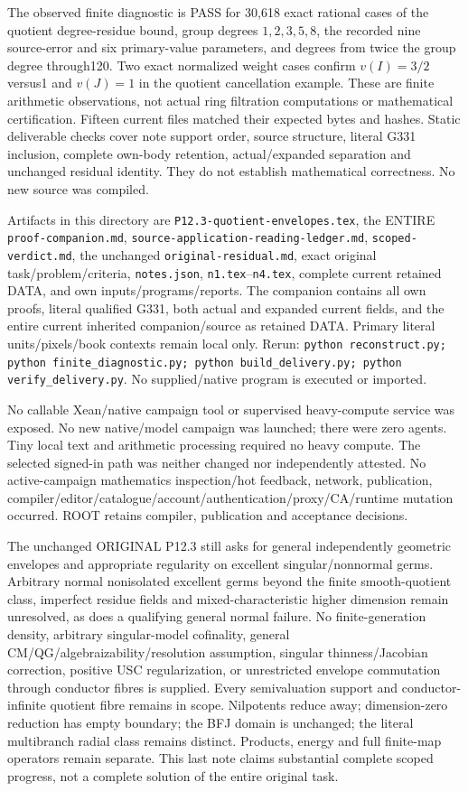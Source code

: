 The observed finite diagnostic is PASS for 30,618 exact rational cases of the quotient degree-residue bound, group degrees $1,2,3,5,8$, the recorded nine source-error and six primary-value parameters, and degrees from twice the group degree through120. Two exact normalized weight cases confirm $v(I)=3/2$ versus1 and $v(J)=1$ in the quotient cancellation example. These are finite arithmetic observations, not actual ring filtration computations or mathematical certification. Fifteen current files matched their expected bytes and hashes. Static deliverable checks cover note support order, source structure, literal G331 inclusion, complete own-body retention, actual/expanded separation and unchanged residual identity. They do not establish mathematical correctness. No new source was compiled.

Artifacts in this directory are \texttt{P12.3-quotient-envelopes.tex}, the ENTIRE \texttt{proof-companion.md}, \texttt{source-application-reading-ledger.md}, \texttt{scoped-verdict.md}, the unchanged \texttt{original-residual.md}, exact original task/problem/criteria, \texttt{notes.json}, \texttt{n1.tex}--\texttt{n4.tex}, complete current retained DATA, and own inputs/programs/reports. The companion contains all own proofs, literal qualified G331, both actual and expanded current fields, and the entire current inherited companion/source as retained DATA. Primary literal units/pixels/book contexts remain local only. Rerun: \texttt{python reconstruct.py; python finite\_diagnostic.py; python build\_delivery.py; python verify\_delivery.py}. No supplied/native program is executed or imported.

No callable Xean/native campaign tool or supervised heavy-compute service was exposed. No new native/model campaign was launched; there were zero agents. Tiny local text and arithmetic processing required no heavy compute. The selected signed-in path was neither changed nor independently attested. No active-campaign mathematics inspection/hot feedback, network, publication, compiler/editor/catalogue/account/authentication/proxy/CA/runtime mutation occurred. ROOT retains compiler, publication and acceptance decisions.

The unchanged ORIGINAL P12.3 still asks for general independently geometric envelopes and appropriate regularity on excellent singular/nonnormal germs. Arbitrary normal nonisolated excellent germs beyond the finite smooth-quotient class, imperfect residue fields and mixed-characteristic higher dimension remain unresolved, as does a qualifying general normal failure. No finite-generation density, arbitrary singular-model cofinality, general CM/QG/algebraizability/resolution assumption, singular thinness/Jacobian correction, positive USC regularization, or unrestricted envelope commutation through conductor fibres is supplied. Every semivaluation support and conductor-infinite quotient fibre remains in scope. Nilpotents reduce away; dimension-zero reduction has empty boundary; the BFJ domain is unchanged; the literal multibranch radial class remains distinct. Products, energy and full finite-map operators remain separate. This last note claims substantial complete scoped progress, not a complete solution of the entire original task.
